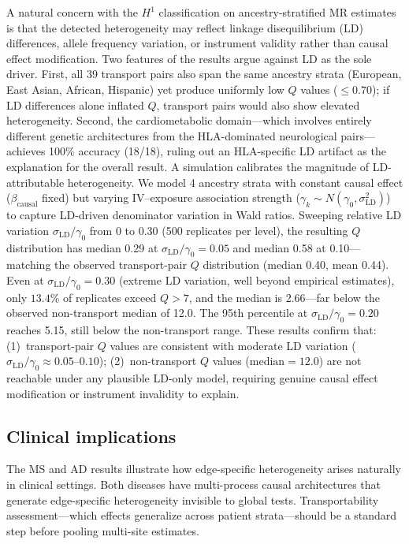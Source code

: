 \documentclass[11pt]{article}
\begin{document}
A natural concern with the $H^1$ classification on ancestry-stratified MR estimates is that the detected heterogeneity may reflect linkage disequilibrium (LD) differences, allele frequency variation, or instrument validity rather than causal effect modification.
Two features of the results argue against LD as the sole driver.
First, all 39 transport pairs also span the same ancestry strata (European, East Asian, African, Hispanic) yet produce uniformly low $Q$ values ($\leq 0.70$); if LD differences alone inflated $Q$, transport pairs would also show elevated heterogeneity.
Second, the cardiometabolic domain---which involves entirely different genetic architectures from the HLA-dominated neurological pairs---achieves 100\% accuracy (18/18), ruling out an HLA-specific LD artifact as the explanation for the overall result.
A simulation calibrates the magnitude of LD-attributable heterogeneity.
We model 4 ancestry strata with constant causal effect ($\beta_{\mathrm{causal}}$ fixed) but varying IV--exposure association strength ($\gamma_k \sim N(\gamma_0, \sigma_{\mathrm{LD}}^2)$) to capture LD-driven denominator variation in Wald ratios.
Sweeping relative LD variation $\sigma_{\mathrm{LD}}/\gamma_0$ from 0 to 0.30 (500 replicates per level), the resulting $Q$ distribution has median 0.29 at $\sigma_{\mathrm{LD}}/\gamma_0 = 0.05$ and median 0.58 at 0.10---matching the observed transport-pair $Q$ distribution (median 0.40, mean 0.44).
Even at $\sigma_{\mathrm{LD}}/\gamma_0 = 0.30$ (extreme LD variation, well beyond empirical estimates), only $13.4\%$ of replicates exceed $Q > 7$, and the median is 2.66---far below the observed non-transport median of 12.0.
The 95th percentile at $\sigma_{\mathrm{LD}}/\gamma_0 = 0.20$ reaches 5.15, still below the non-transport range.
These results confirm that: (1)~transport-pair $Q$ values are consistent with moderate LD variation ($\sigma_{\mathrm{LD}}/\gamma_0 \approx 0.05$--$0.10$); (2)~non-transport $Q$ values ($\text{median} = 12.0$) are not reachable under any plausible LD-only model, requiring genuine causal effect modification or instrument invalidity to explain.

\subsection{Clinical implications}

The MS and AD results illustrate how edge-specific heterogeneity arises naturally in clinical settings.
Both diseases have multi-process causal architectures that generate edge-specific heterogeneity invisible to global tests.
Transportability assessment---which effects generalize across patient strata---should be a standard step before pooling multi-site estimates.
\end{document}
